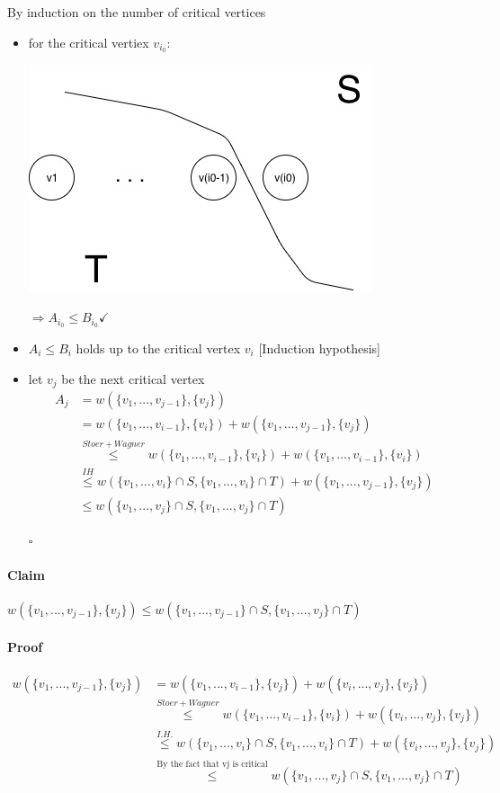 By induction on the number of critical vertices
\begin{itemize}
\item for the critical vertiex $v_{i_0}:$ \\
\begin{center}
	\includegraphics[scale=0.5]{img/cut2}
\end{center}
$\Rightarrow A_{i_0} \leq B_{i_0} \checkmark$  

\item  $A_i \leq B_i$ holds up to the critical vertex $v_i$ [Induction hypothesis]
\item  let $v_j$ be the next critical vertex
\begin{align*}
A_j &= w(\{v_1,...,v_{j-1}\}, \{v_j\}) \\
&= w(\{v_1,...,v_{i-1}\}, \{v_i\}) + w(\{v_1,...,v_{j-1}\}, \{v_j\}) \\
&\stackrel{Stoer+Wagner}{\leq} w(\{v_1,...,v_{i-1}\}, \{v_i\}) + w(\{v_1,...,v_{i-1}\}, \{v_i\}) \\
&\stackrel{IH}{\leq} w(\{v_1,...,v_i\}\cap S,\{v_1,...,v_i\} \cap T) + w(\{v_1,...,v_{j-1}\}, \{v_j\}) \\
&\leq w(\{v_1,...,v_j\}\cap S,\{v_1,...,v_j\}\cap T)
\end{align*}
\begin{flushright}
$\square$
\end{flushright}
\end{itemize}

\paragraph{Claim } 
$w(\{v_1,...,v_{j-1}\},\{v_j\}) \leq w(\{v_1,...,v_{j-1}\} \cap S, \{v_1,...,v_j\}\cap T)$

\paragraph{Proof}
\begin{align*}
w(\{v_1,...,v_{j-1}\},\{v_j\}) &= w(\{v_1,...,v_{i-1}\},\{v_j\}) + w(\{v_i,...,v_{j}\},\{v_j\}) \\
&\stackrel{Stoer+Wagner}{\leq} w(\{v_1,...,v_{i-1}\},\{v_i\}) + w(\{v_i,...,v_{j}\},\{v_j\}) \\
&\stackrel{I.H.}{\leq} w(\{v_1,...,v_{i}\} \cap S, \{v_1,...,v_i\}\cap T) + w(\{v_i,...,v_{j}\},\{v_j\}) \\
&\stackrel{\text{By the fact that vj is critical}}{\leq} w(\{v_1,...,v_{j}\} \cap S, \{v_1,...,v_j\}\cap T) 
\end{align*}

